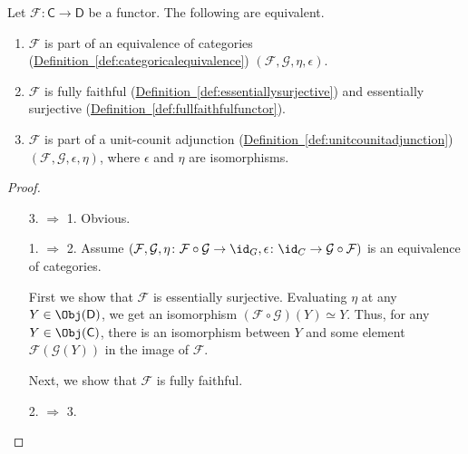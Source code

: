 \documentclass[main.tex]{subfiles}
\begin{document}
\begin{theorem}
  Let $\mathcal{F}\colon \mathsf{C} \to \mathsf{D}$ be a functor. The following are equivalent.
  \begin{enumerate}
    \item $\mathcal{F}$ is part of an equivalence of categories (\hyperref[def:categoricalequivalence]{Definition~\ref*{def:categoricalequivalence}}) $(\mathcal{F}, \mathcal{G}, \eta, \epsilon)$.

    \item $\mathcal{F}$ is fully faithful (\hyperref[def:essentiallysurjective]{Definition~\ref*{def:essentiallysurjective}}) and essentially surjective (\hyperref[def:fullfaithfulfunctor]{Definition~\ref*{def:fullfaithfulfunctor}}).

    \item $\mathcal{F}$ is part of a unit-counit adjunction (\hyperref[def:unitcounitadjunction]{Definition~\ref*{def:unitcounitadjunction}}) $(\mathcal{F}, \mathcal{G}, \epsilon, \eta)$, where $\epsilon$ and $\eta$ are isomorphisms.
  \end{enumerate}
\end{theorem}
\begin{proof}
  \leavevmode
  \begin{enumerate}
    \item[3. $\Rightarrow$ 1.] Obvious.

    \item[1. $\Rightarrow$ 2.] Assume $(\mathcal{F}, \mathcal{G}, \eta\colon \mathcal{F} \circ \mathcal{G} \to \id_{G}, \epsilon\colon \id_{C} \to \mathcal{G} \circ \mathcal{F})$ is an equivalence of categories.

      First we show that $\mathcal{F}$ is essentially surjective. Evaluating $\eta$ at any $Y \in \Obj(\mathsf{D})$, we get an isomorphism $(\mathcal{F} \circ \mathcal{G})(Y) \simeq Y$. Thus, for any $Y \in \Obj(\mathsf{C})$, there is an isomorphism between $Y$ and some element $\mathcal{F}(\mathcal{G}(Y))$ in the image of $\mathcal{F}$.

      Next, we show that $\mathcal{F}$ is fully faithful.

    \item[2. $\Rightarrow$ 3.]
  \end{enumerate}
\end{proof}
\end{document}

